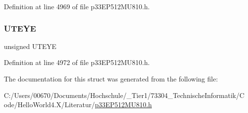 Definition at line 4969 of file p33\+E\+P512\+M\+U810.\+h.

\mbox{\label{structtag_u1_c_n_f_g1_b_i_t_s_a59d6746634afd4413989dfc9c9dee289}} 
\subsubsection{\texorpdfstring{U\+T\+E\+YE}{UTEYE}}
{\footnotesize\ttfamily unsigned U\+T\+E\+YE}



Definition at line 4972 of file p33\+E\+P512\+M\+U810.\+h.



The documentation for this struct was generated from the following file\+:\begin{DoxyCompactItemize}
\item 
C\+:/\+Users/00670/\+Documents/\+Hochschule/\+\_\+\+Tier1/73304\+\_\+\+Technische\+Informatik/\+Code/\+Hello\+World4.\+X/\+Literatur/\hyperlink{p33_e_p512_m_u810_8h}{p33\+E\+P512\+M\+U810.\+h}\end{DoxyCompactItemize}

